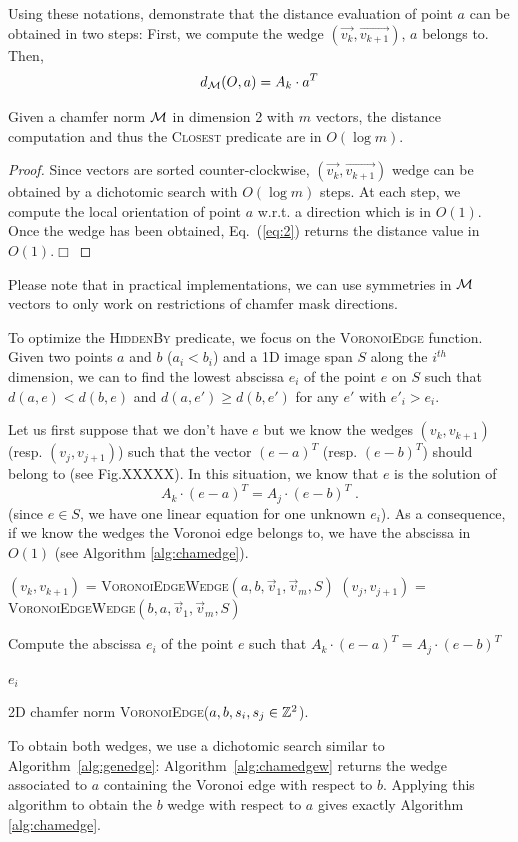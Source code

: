 \documentclass{llncs}
\begin{document}
Using these notations, \cite{Thiel_hdr,Strand2008} demonstrate that
the distance evaluation of point $a$ can be obtained in two steps:
First, we compute the wedge $(\vec{v_k},\vec{v_{k+1}})$, $a$ belongs
to. Then,
\begin{equation}
\label{eq:2}
  d_{\mathcal{M}}(O,a) = A_k\cdot a^T
\end{equation}

\begin{lemma}
\label{lem:log}
  Given a chamfer norm $\mathcal{M}$ in dimension 2 with $m$ vectors, the distance computation
  and thus the \textsc{Closest} predicate are in $O(\log{m})$.
\end{lemma}
\begin{proof}
  Since vectors are sorted counter-clockwise,
  $(\vec{v_k},\vec{v_{k+1}})$ wedge can be obtained by a dichotomic
  search with $O(\log{m})$ steps. At each step, we compute the local
  orientation of point $a$ w.r.t. a direction which is in $O(1)$. Once
  the wedge has been obtained, Eq.~(\ref{eq:2}) returns the distance
  value in $O(1)$.$\Box$
\end{proof}

Please note that in practical implementations, we can use symmetries
in $\mathcal{M}$ vectors to only work on restrictions of chamfer mask
directions.

To optimize the \textsc{HiddenBy} predicate, we focus on the
\textsc{VoronoiEdge} function. Given two points $a$ and $b$
($a_i<b_i$) and a 1D image span $S$ along the $i^{th}$ dimension, we
can to find the lowest abscissa $e_i$ of the point $e$ on $S$ such
that $d(a,e) < d(b,e)$ and $d(a,e')\geq d(b, e')$ for any $e'$ with
$e'_i>e_i$.

Let us first suppose that we don't have $e$ but we know the wedges
$(v_{k},v_{k+1})$ (resp. $(v_j,v_{j+1})$) such that the vector
$(e-a)^T$ (resp. $(e-b)^T$) should belong to (see Fig.XXXXX). In this
situation, we know that $e$ is the solution of
\begin{equation}
\label{eq:3}
  A_k\cdot  (e-a)^T = A_j\cdot (e -b)^T\;.
\end{equation}
(since $e\in S$, we have one linear equation for one unknown
$e_i$). As a consequence, if we know the wedges the Voronoi edge
belongs to, we have the abscissa in $O(1)$ (see Algorithm \ref{alg:chamedge}).
\begin{algorithm}[h]\small
  $(v_k,v_{k+1})$ = \textsc{VoronoiEdgeWedge}$(a,b,\vec{v}_1,\vec{v}_m, S)$\;
  $(v_j,v_{j+1})$ = \textsc{VoronoiEdgeWedge}$(b,a,\vec{v}_1,\vec{v}_m, S)$\;

  Compute the abscissa $e_i$ of the point $e$ such that $A_k\cdot
  (e-a)^T = A_j\cdot (e -b)^T$\;

  \Return $e_i$\;
  \caption{2D chamfer norm \textsc{VoronoiEdge}($a,b,s_i,s_j\in{\mathbb{Z}}^2$).\label{alg:chamedge}}
\end{algorithm}
To obtain both wedges, we use a dichotomic search similar to
Algorithm~\ref{alg:genedge}: Algorithm~\ref{alg:chamedgew} returns the
wedge associated to $a$ containing the Voronoi edge with respect to
$b$. Applying this algorithm to obtain the $b$ wedge with respect to
$a$ gives exactly  Algorithm \ref{alg:chamedge}.
\end{document}
